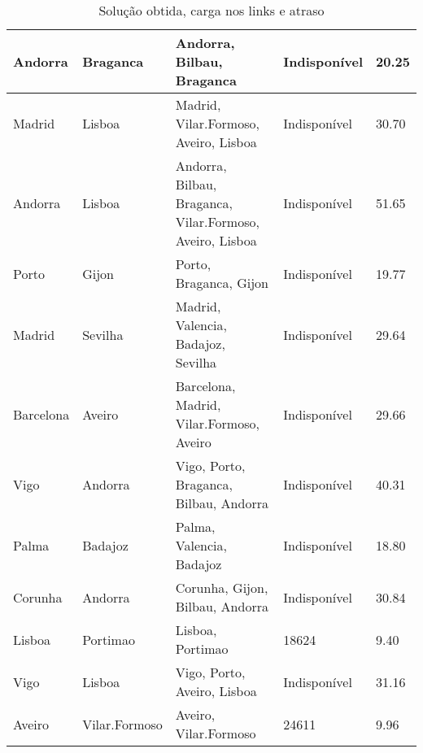 \begin{table}[!htb]
{\begin{tabular}{|l|l|l|l|l|}
Andorra & Braganca & Andorra, Bilbau, Braganca & Indisponível & 20.25 \\ \hline
Madrid & Lisboa & Madrid, Vilar.Formoso, Aveiro, Lisboa & Indisponível & 30.70 \\ \hline
Andorra & Lisboa & Andorra, Bilbau, Braganca, Vilar.Formoso, Aveiro, Lisboa & Indisponível & 51.65 \\ \hline
Porto & Gijon & Porto, Braganca, Gijon & Indisponível & 19.77 \\ \hline
Madrid & Sevilha & Madrid, Valencia, Badajoz, Sevilha & Indisponível & 29.64 \\ \hline
Barcelona & Aveiro & Barcelona, Madrid, Vilar.Formoso, Aveiro & Indisponível & 29.66 \\ \hline
Vigo & Andorra & Vigo, Porto, Braganca, Bilbau, Andorra & Indisponível & 40.31 \\ \hline
Palma & Badajoz & Palma, Valencia, Badajoz & Indisponível & 18.80 \\ \hline
Corunha & Andorra & Corunha, Gijon, Bilbau, Andorra & Indisponível & 30.84 \\ \hline
Lisboa & Portimao & Lisboa, Portimao & 18624 & 9.40 \\ \hline
Vigo & Lisboa & Vigo, Porto, Aveiro, Lisboa & Indisponível & 31.16 \\ \hline
Aveiro & Vilar.Formoso & Aveiro, Vilar.Formoso & 24611 & 9.96 \\ \hline
\end{tabular}}
\caption[]{Solução obtida, carga nos links e atraso}
\end{table}

